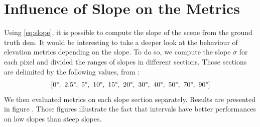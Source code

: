 \section{Influence of Slope on the Metrics}
Using \cref{eq:slope}, it is possible to compute the slope of the scene from the ground truth \acrshort{dsm}. It would be interesting to take a deeper look at the behaviour of elevation metrics depending on the slope. To do so, we compute the slope $\sigma$ for each pixel and divided the ranges of slopes in different sections. Those sections are delimited by the following values, from \cite{hugonnet_uncertainty_2022}:
$$
[0\degree, ~2.5\degree, ~5\degree, ~10\degree, ~15\degree, ~20\degree, ~30\degree, ~40\degree, ~50\degree, ~70\degree, ~90\degree]
$$
We then evaluated metrics on each slope section separately. Results are presented in figure . Those figures illustrate the fact that intervals have better performances on low slopes than steep slopes.

